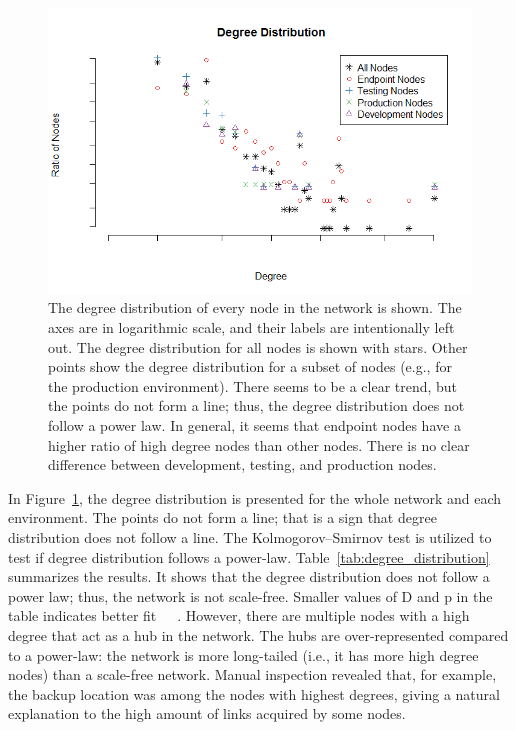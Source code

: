 \documentclass[english, 12pt, a4paper, sci, utf8, a-2b, online, obeyspaces]{aaltothesis}
\begin{document}
\begin{figure}[htbp]
  \centering
  \includegraphics[width=\textwidth]{pictures/network/DegreeDistribution.png}
  \caption{The degree distribution of every node in the network is shown. The axes are in logarithmic scale, and their labels are intentionally left out. The degree distribution for all nodes is shown with stars. Other points show the degree distribution for a subset of nodes (e.g., for the production environment). There seems to be a clear trend, but the points do not form a line; thus, the degree distribution does not follow a power law. In general, it seems that endpoint nodes have a higher ratio of high degree nodes than other nodes. There is no clear difference between development, testing, and production nodes.}
  \label{fig:degree_distributionWhole}
\end{figure}

In Figure~\ref{fig:degree_distributionWhole}, the degree distribution is presented for the whole network and each environment. The points do not form a line; that is a sign that degree distribution does not follow a line. The Kolmogorov–Smirnov test is utilized to test if degree distribution follows a power-law. Table~\ref{tab:degree_distribution} summarizes the results. It shows that the degree distribution does not follow a power law; thus, the network is not scale-free. Smaller values of D and p in the table indicates better fit~\cite{nepusz2019fitting}~\cite{newman2005power}~\cite{clauset2009power}. However, there are multiple nodes with a high degree that act as a hub in the network. The hubs are over-represented compared to a power-law: the network is more long-tailed (i.e., it has more high degree nodes) than a scale-free network. Manual inspection revealed that, for example, the backup location was among the nodes with highest degrees, giving a natural explanation to the high amount of links acquired by some nodes.
\end{document}
